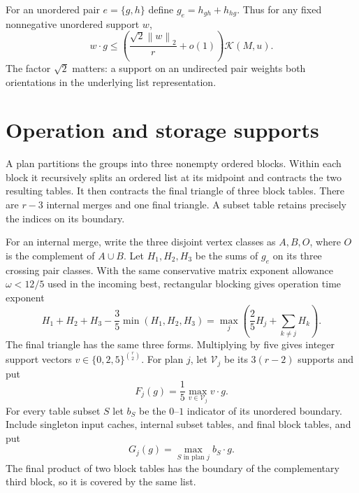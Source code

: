 \documentclass[11pt]{article}
\theoremstyle{definition}\newtheorem{definition}[theorem]{Definition}
\theoremstyle{remark}\newtheorem{remark}[theorem]{Remark}
\newcommand{\K}{\mathcal K}
\newcommand{\norm}[1]{\left\lVert#1\right\rVert_2}
\begin{document}
For an unordered pair $e=\{g,h\}$ define $g_e=h_{gh}+h_{hg}$. Thus for
any fixed nonnegative unordered support $w$,
\begin{equation}\label{eq:unordered}
 w\cdot g\le\left(\frac{\sqrt2\norm w}{r}+o(1)\right)\K(M,u).
\end{equation}
The factor $\sqrt2$ matters: a support on an undirected pair weights both
orientations in the underlying list representation.

\section{Operation and storage supports}
\label{sec:supports}

A plan partitions the groups into three nonempty ordered blocks. Within
each block it recursively splits an ordered list at its midpoint and
contracts the two resulting tables. It then contracts the final triangle
of three block tables. There are $r-3$ internal merges and one final
triangle. A subset table retains precisely the indices on its boundary.

For an internal merge, write the three disjoint vertex classes as $A,B,O$,
where $O$ is the complement of $A\cup B$. Let $H_1,H_2,H_3$ be the sums of
$g_e$ on its three crossing pair classes. With the same conservative
matrix exponent allowance $\omega<12/5$ used in the incoming best,
rectangular blocking gives operation time exponent
\begin{equation}\label{eq:mm}
 H_1+H_2+H_3-\frac35\min(H_1,H_2,H_3)
 =\max_j\left(\frac25H_j+\sum_{k\ne j}H_k\right).
\end{equation}
The final triangle has the same three forms. Multiplying by five gives
integer support vectors $v\in\{0,2,5\}^{\binom r2}$. For plan $j$, let
$\mathcal V_j$ be its $3(r-2)$ supports and put
\[
 F_j(g)=\frac15\max_{v\in\mathcal V_j}v\cdot g.
\]
For every table subset $S$ let $b_S$ be the $0$--$1$ indicator of its
unordered boundary. Include singleton input caches, internal subset tables,
and final block tables, and put
\[
 G_j(g)=\max_{S\text{ in plan }j}b_S\cdot g.
\]
The final product of two block tables has the boundary of the complementary
third block, so it is covered by the same list.
\end{document}
